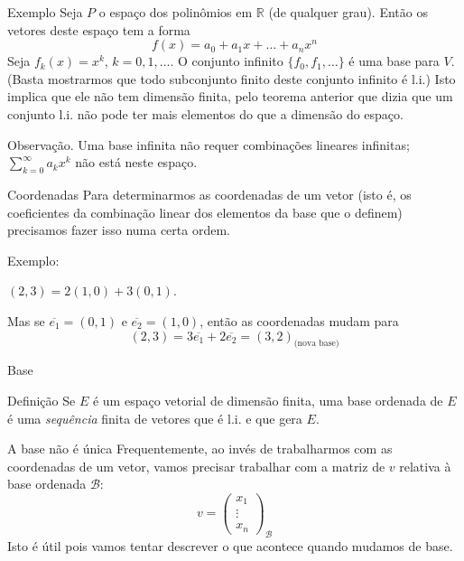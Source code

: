 \documentclass{beamer}
\begin{document}
\begin{darkframes}
\begin{frame}{Exemplo}
  Seja $P$ o espaço dos polinômios em ${\mathbb{R}}$ (de qualquer grau).  Então os vetores deste espaço tem a forma
  \begin{equation*}
     f(x) = a_0+a_1x+\ldots +a_nx^n
  \end{equation*}
  Seja $f_k(x) = x^k$, $k=0,1,\ldots$. O conjunto infinito $\{f_0, f_1,\ldots\}$ é uma base para $V$. (Basta mostrarmos que todo subconjunto finito deste conjunto infinito é l.i.) Isto implica que ele não tem dimensão finita, pelo teorema anterior que dizia que um conjunto l.i. não pode ter mais elementos do que a dimensão do espaço. 
  
 \alert{Observação.} Uma base infinita não requer combinações lineares infinitas; $\sum_{k=0}^{\infty} a_kx^k$ não está neste espaço.
\end{frame}

\begin{frame}{Coordenadas}
  Para determinarmos as coordenadas de um vetor (isto é, os coeficientes da combinação linear dos elementos da base que o definem) precisamos fazer isso numa certa ordem.

  \alert{Exemplo:}
  
  $(2,3) = 2(1,0)+3(0,1)$.

  Mas se $\overline{e_1} = (0,1)$ e $\overline{e_2} = (1,0)$, então as coordenadas mudam para 
  \begin{equation*}
     (2,3) = 3\overline{e_1}+2\overline{e_2} = (3,2)_{\text{(nova base)}}
  \end{equation*}
\end{frame}

\begin{frame}{Base}
  \begin{block}{Definição}
    Se $E$ é um espaço vetorial de dimensão finita, uma base ordenada de $E$ é uma \emph{sequência} finita de vetores que é l.i. e que gera $E$.
  \end{block}
  \vfill
\end{frame}

\begin{frame}{A base não é única}
  Frequentemente, ao invés de trabalharmos com as coordenadas de um vetor, vamos precisar trabalhar com a matriz de $v$ relativa à base ordenada ${\mathcal{B}}$:
  \begin{equation*}
    v =
    \begin{pmatrix}
      x_1\\\vdots\\ x_n
    \end{pmatrix}_{\mathcal{B}}
  \end{equation*}
  Isto é útil pois vamos tentar descrever o que acontece quando mudamos de base.
\end{frame}


\end{darkframes}
\end{document}
